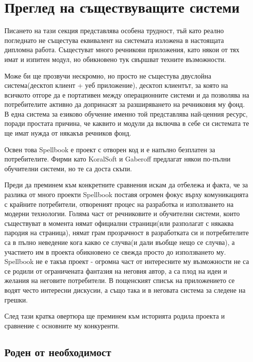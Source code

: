 \chapter{Преглед на съществуващите системи}

Писането на тази секция представлява особена трудност, тъй като реално
погледнато не същестува еквивалент на системата изложена в настоящата
дипломна работа. Същестуват много речникови приложения, като някои от
тях имат и изпитен модул, но обикновено тук свършват техните
възможности. 

Може би ще прозвучи нескромно, но просто не същестува двуслойна
система(десктоп клиент + уеб приложение), десктоп клиентът, за която
на всичкото отгоре да е портативен между операционните системи и да
позволява на потребителите активно да допринасят за разширяването на
речниковия му фонд. В една система за езиково обучение именно той
представлява най-ценния ресурс, поради простата причина, че каквито и
модули да включва в себе си системата те ще имат нужда от някакъв
речников фонд.

Освен това Spellbook е проект с отворен код и е напълно безплатен за
потребителите. Фирми като KoralSoft и Gaberoff предлагат някои
по-пълни обучителни системи, но те са доста скъпи.

Преди да преминем към конкретните сравнения искам да отбележа и факта,
че за разлика от много проекти Spellbook поставя огромен фокус върху
комуникацията с крайните потребители, отвореният процес на разработка
и използването на модерни технологии. Голяма част от речниковите и
обучителни системи, които съществуват в момента нямат официални
страници(или разполагат с някаква пародия на страница), нямат грам
прозрачност в разработката си и потребителите са в пълно неведение
кога какво се случва(и дали въобще нещо се случва), а участието им в
проекта обикновено се свежда просто до използването му. Spellbook не е
такъв проект - огромна част от интересните му възможности не са се
родили от ограничената фантазия на неговия автор, а са плод на идеи и
желания на неговите потребители. В пощенският списък на приложението
се водят често интересни дискусии, а също така и в неговата система за
следене на грешки.

След тази кратка овертюра ще преминем към историята родила проекта и
сравнение с основните му конкуренти.
\section{Роден от необходимост}


